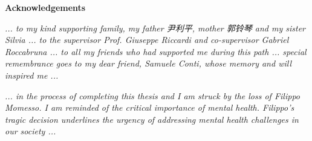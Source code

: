 \thispagestyle{empty}

\begin{center}
  {\bf \Huge Acknowledgements}
\end{center}

\vspace{4cm}


\emph{... to my kind supporting family, my father 尹利平, mother 郭铃琴 and my sister Silvia ... to the supervisor Prof. Giuseppe Riccardi and co-supervisor Gabriel Roccabruna ... to all my friends who had supported me during this path ... special remembrance goes to my dear friend, Samuele Conti, whose memory and will inspired me ... }

\vspace{1em}

\emph{ ... in the process of completing this thesis and I am struck by the loss of Filippo Momesso. I am reminded of the critical importance of mental health. Filippo's tragic decision underlines the urgency of addressing mental health challenges in our society ... }